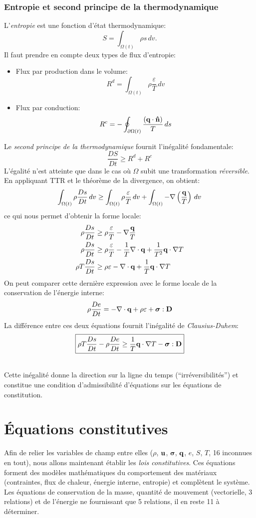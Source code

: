 \section{Entropie et second principe de la thermodynamique}
L'\emph{entropie} est une fonction d'état thermodynamique: $$S=\int_{\Omega (t)}\rho s\,dv.$$ Il faut prendre en compte deux types de flux d'entropie:
\begin{itemize}
\item Flux par production dans le volume: $$R^d=\int_{\Omega (t)}\rho \frac{\varepsilon}{T}\,dv$$
\item Flux par conduction: $$R^c=-\oint_{\partial \Omega (t)}\frac{(\textbf{q}\cdot\textbf{\^n})}{T}\,ds$$
\end{itemize}
Le \emph{second principe de la thermodynamique} fournit l'inégalité fondamentale:
$$\boxed{\frac{DS}{Dt}\geq R^d+R^c}$$ L'égalité n'est atteinte que dans le cas où $\Omega$ subit une transformation \emph{réversible}. En appliquant TTR et le théorème de la divergence, on obtient:
$$\int_{\Omega (t)}\rho\frac{Ds}{Dt}\,dv\geq \int_{\Omega (t)}\rho \frac{\varepsilon}{T}\,dv+\int_{\Omega (t)}-\nabla\left(\frac{\textbf{q}}{T}\right)\,dv$$
ce qui nous permet d'obtenir la forme locale:
\begin{align*}
\rho\frac{Ds}{Dt}&\geq \rho \frac{\varepsilon}{T}-\nabla\frac{\textbf{q}}{T}\\
\rho\frac{Ds}{Dt}&\geq \rho \frac{\varepsilon}{T}-\frac{1}{T}\nabla\cdot\textbf{q}+\frac{1}{T^2}\textbf{q}\cdot\nabla T\\
\rho T\frac{Ds}{Dt}&\geq \rho \varepsilon-\nabla\cdot\textbf{q}+\frac{1}{T}\textbf{q}\cdot\nabla T
\end{align*}
On peut comparer cette dernière expression avec le forme locale de la conservation de l'énergie interne:
$$\rho\frac{De}{Dt}=-\nabla\cdot\textbf{q}+\rho\varepsilon+\boldsymbol{\sigma}:\textbf{D}$$
La différence entre ces deux équations fournit l'inégalité de \emph{Clausius-Duhem}:
$$\boxed{\rho T\frac{Ds}{Dt}-\rho\frac{De}{Dt}\geq\frac{1}{T}\textbf{q}\cdot\nabla T-\boldsymbol{\sigma}:\textbf{D}}$$
\paragraph{}
Cette inégalité donne la direction sur la ligne du temps (``irréversibilités'') et constitue une condition d'admissibilité d'équations sur les équations de constitution.

\part{\'Equations constitutives}
Afin de relier les variables de champ entre elles ($\rho$, $\textbf{u}$, $\boldsymbol{\sigma}$, $\textbf{q}$, $e$, $S$, $T$, 16 inconnues en tout), nous allons maintenant établir les \emph{lois constitutives}. Ces équations forment des modèles mathématiques du comportement des matériaux (contraintes, flux de chaleur, énergie interne, entropie) et complètent le système. Les équations de conservation de la masse, quantité de mouvement (vectorielle, 3 relations) et de l'énergie ne fournissant que 5 relations, il en reste 11 à déterminer.


